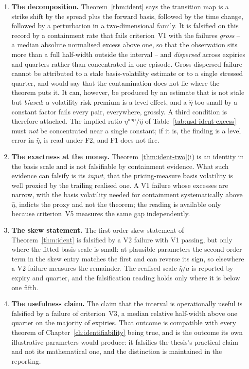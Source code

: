 \documentclass[../../../main.tex]{subfiles}
\begin{document}
\begin{enumerate}[label=\textbf{F\arabic*.},leftmargin=2.2\parindent]
\item \textbf{The decomposition.} Theorem~\ref{thm:ident} says the transition map is a strike shift by the spread plus the forward basis, followed by the time change, followed by a perturbation in a two-dimensional family. It is falsified on this record by a containment rate that fails criterion~V1 with the failures \emph{gross} -- a median absolute normalised excess above one, so that the observation sits more than a full half-width outside the interval -- and \emph{dispersed} across expiries and quarters rather than concentrated in one episode. Gross dispersed failure cannot be attributed to a stale basis-volatility estimate or to a single stressed quarter, and would say that the contamination does not lie where the theorem puts it. It can, however, be produced by an estimate that is not stale but \emph{biased}: a volatility risk premium is a level effect, and a $\hat\eta$ too small by a constant factor fails every pair, everywhere, grossly. A third condition is therefore attached. The implied ratio $\eta^{\mathrm{imp}}/\hat\eta$ of Table~\ref{tab:usd-ident-excess} must \emph{not} be concentrated near a single constant; if it is, the finding is a level error in $\hat\eta$, is read under F2, and F1 does not fire.
\item \textbf{The exactness at the money.} Theorem~\ref{thm:ident-two}(i) is an identity in the basis scale and is not falsifiable by containment evidence. What such evidence can falsify is its \emph{input}, that the pricing-measure basis volatility is well proxied by the trailing realised one. A V1 failure whose excesses are narrow, with the basis volatility needed for containment systematically above $\hat\eta$, indicts the proxy and not the theorem; the reading is available only because criterion~V5 measures the same gap independently.
\item \textbf{The skew statement.} The first-order skew statement of Theorem~\ref{thm:ident} is falsified by a V2 failure with V1 passing, but only where the fitted basis scale is small: at plausible parameters the second-order term in the skew entry matches the first and can reverse its sign, so elsewhere a V2 failure measures the remainder. The realised scale $\hat\eta/a$ is reported by expiry and quarter, and the falsification reading holds only where it is below one fifth.
\item \textbf{The usefulness claim.} The claim that the interval is operationally useful is falsified by a failure of criterion~V3, a median relative half-width above one quarter on the majority of expiries. That outcome is compatible with every theorem of Chapter~\ref{ch:identifiability} being true, and is the outcome its own illustrative parameters would produce: it falsifies the thesis's practical claim and not its mathematical one, and the distinction is maintained in the reporting.

\end{enumerate}
\end{document}
